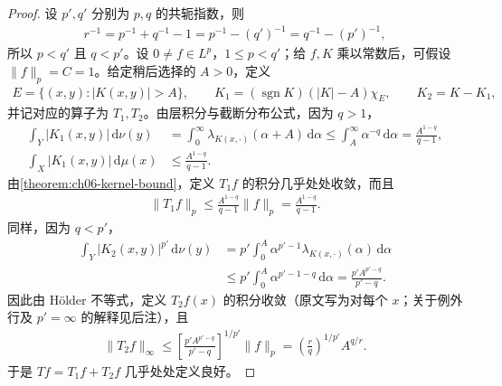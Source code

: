 \documentclass[../../main.tex]{subfiles}
\begin{document}
\begin{proof}
设 $p',q'$ 分别为 $p,q$ 的共轭指数，则
\begin{align*}
r^{-1}=p^{-1}+q^{-1}-1=p^{-1}-(q')^{-1}=q^{-1}-(p')^{-1},
\end{align*}
所以 $p<q'$ 且 $q<p'$。设 $0\ne f\in L^p$，$1\leqslant p<q'$；给 $f,K$ 乘以常数后，可假设 $\|f\|_p=C=1$。给定稍后选择的 $A>0$，定义
\begin{align*}
E=\{(x,y):|K(x,y)|>A\},\qquad
K_1=(\operatorname{sgn}K)(|K|-A)\chi_E,\qquad K_2=K-K_1,
\end{align*}
并记对应的算子为 $T_1,T_2$。由层积分与截断分布公式，因为 $q>1$，
\begin{align*}
\int_Y|K_1(x,y)|\,\mathrm d\nu(y)
&=\int_0^\infty\lambda_{K(x,\cdot)}(\alpha+A)\,\mathrm d\alpha
\leqslant\int_A^\infty\alpha^{-q}\,\mathrm d\alpha
=\frac{A^{1-q}}{q-1},\\
\int_X|K_1(x,y)|\,\mathrm d\mu(x)&\leqslant\frac{A^{1-q}}{q-1}.
\end{align*}
由\cref{theorem:ch06-kernel-bound}，定义 $T_1f$ 的积分几乎处处收敛，而且
\begin{align}
\|T_1f\|_p\leqslant\frac{A^{1-q}}{q-1}\|f\|_p
=\frac{A^{1-q}}{q-1}.
\label{align:ch06-weak-kernel-large}
\end{align}
同样，因为 $q<p'$，
\begin{align*}
\int_Y|K_2(x,y)|^{p'}\,\mathrm d\nu(y)
&=p'\int_0^A\alpha^{p'-1}\lambda_{K(x,\cdot)}(\alpha)\,\mathrm d\alpha\\
&\leqslant p'\int_0^A\alpha^{p'-1-q}\,\mathrm d\alpha
=\frac{p'A^{p'-q}}{p'-q}.
\end{align*}
因此由 Hölder 不等式，定义 $T_2f(x)$ 的积分收敛（原文写为对每个 $x$；关于例外行及 $p'=\infty$ 的解释见后注），且
\begin{align}
\|T_2f\|_\infty\leqslant
\left[\frac{p'A^{p'-q}}{p'-q}\right]^{1/p'}\|f\|_p
=\left(\frac rq\right)^{1/p'}A^{q/r}.
\label{align:ch06-weak-kernel-small}
\end{align}
于是 $Tf=T_1f+T_2f$ 几乎处处定义良好。


\end{proof}
\end{document}
